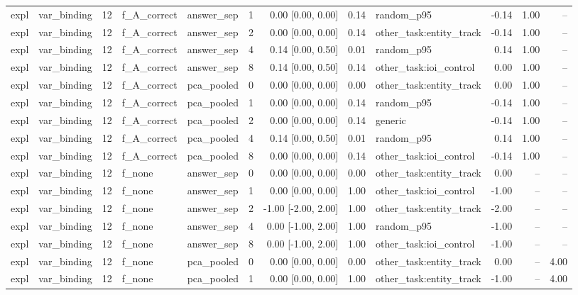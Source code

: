 \begin{tabular}{llrllrrrlrrr}
expl & var\_binding & 12 & f\_A\_correct & answer\_sep & 1 & 0.00 [0.00, 0.00] & 0.14 & random\_p95 & -0.14 & 1.00 & -- \\
expl & var\_binding & 12 & f\_A\_correct & answer\_sep & 2 & 0.00 [0.00, 0.00] & 0.14 & other\_task:entity\_track & -0.14 & 1.00 & -- \\
expl & var\_binding & 12 & f\_A\_correct & answer\_sep & 4 & 0.14 [0.00, 0.50] & 0.01 & random\_p95 & 0.14 & 1.00 & -- \\
expl & var\_binding & 12 & f\_A\_correct & answer\_sep & 8 & 0.14 [0.00, 0.50] & 0.14 & other\_task:ioi\_control & 0.00 & 1.00 & -- \\
expl & var\_binding & 12 & f\_A\_correct & pca\_pooled & 0 & 0.00 [0.00, 0.00] & 0.00 & other\_task:entity\_track & 0.00 & 1.00 & -- \\
expl & var\_binding & 12 & f\_A\_correct & pca\_pooled & 1 & 0.00 [0.00, 0.00] & 0.14 & random\_p95 & -0.14 & 1.00 & -- \\
expl & var\_binding & 12 & f\_A\_correct & pca\_pooled & 2 & 0.00 [0.00, 0.00] & 0.14 & generic & -0.14 & 1.00 & -- \\
expl & var\_binding & 12 & f\_A\_correct & pca\_pooled & 4 & 0.14 [0.00, 0.50] & 0.01 & random\_p95 & 0.14 & 1.00 & -- \\
expl & var\_binding & 12 & f\_A\_correct & pca\_pooled & 8 & 0.00 [0.00, 0.00] & 0.14 & other\_task:ioi\_control & -0.14 & 1.00 & -- \\
expl & var\_binding & 12 & f\_none & answer\_sep & 0 & 0.00 [0.00, 0.00] & 0.00 & other\_task:entity\_track & 0.00 & -- & -- \\
expl & var\_binding & 12 & f\_none & answer\_sep & 1 & 0.00 [0.00, 0.00] & 1.00 & other\_task:ioi\_control & -1.00 & -- & -- \\
expl & var\_binding & 12 & f\_none & answer\_sep & 2 & -1.00 [-2.00, 2.00] & 1.00 & other\_task:entity\_track & -2.00 & -- & -- \\
expl & var\_binding & 12 & f\_none & answer\_sep & 4 & 0.00 [-1.00, 2.00] & 1.00 & random\_p95 & -1.00 & -- & -- \\
expl & var\_binding & 12 & f\_none & answer\_sep & 8 & 0.00 [-1.00, 2.00] & 1.00 & other\_task:ioi\_control & -1.00 & -- & -- \\
expl & var\_binding & 12 & f\_none & pca\_pooled & 0 & 0.00 [0.00, 0.00] & 0.00 & other\_task:entity\_track & 0.00 & -- & 4.00 \\
expl & var\_binding & 12 & f\_none & pca\_pooled & 1 & 0.00 [0.00, 0.00] & 1.00 & other\_task:entity\_track & -1.00 & -- & 4.00 \\

\end{tabular}
